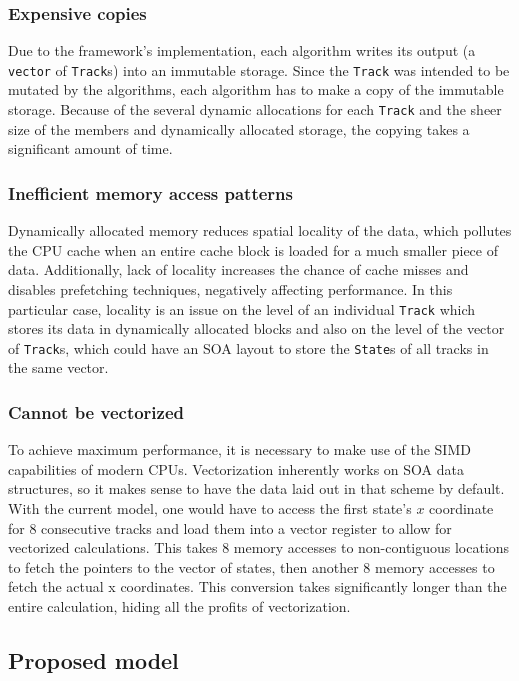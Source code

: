 \documentclass[12pt]{article}
\newcommand{\code}[1]{\texttt{#1}}
\begin{document}
\subsubsection{Expensive copies}

Due to the framework's implementation, each algorithm writes its output (a \code{vector} of \code{Track}s) into an immutable storage. Since the \code{Track} was intended to be mutated by the algorithms, each algorithm has to make a copy of the immutable storage. Because of the several dynamic allocations for each \code{Track} and the sheer size of the members and dynamically allocated storage, the copying takes a significant amount of time.

\subsubsection{Inefficient memory access patterns}

Dynamically allocated memory reduces spatial locality of the data, which pollutes the CPU cache when an entire cache block is loaded for a much smaller piece of data. Additionally, lack of locality increases the chance of cache misses and disables prefetching techniques, negatively affecting performance. In this particular case, locality is an issue on the level of an individual \code{Track} which stores its data in dynamically allocated blocks and also on the level of the vector of \code{Track}s, which could have an SOA layout to store the \code{State}s of all tracks in the same vector.

\subsubsection{Cannot be vectorized}

To achieve maximum performance, it is necessary to make use of the SIMD capabilities of modern CPUs. Vectorization inherently works on SOA data structures, so it makes sense to have the data laid out in that scheme by default. With the current model, one would have to access the first state's $x$ coordinate for 8 consecutive tracks and load them into a vector register to allow for vectorized calculations. This takes 8 memory accesses to non-contiguous locations to fetch the pointers to the vector of states, then another 8 memory accesses to fetch the actual x coordinates. This conversion takes significantly longer than the entire calculation, hiding all the profits of vectorization.


\subsection{Proposed model}
\end{document}
